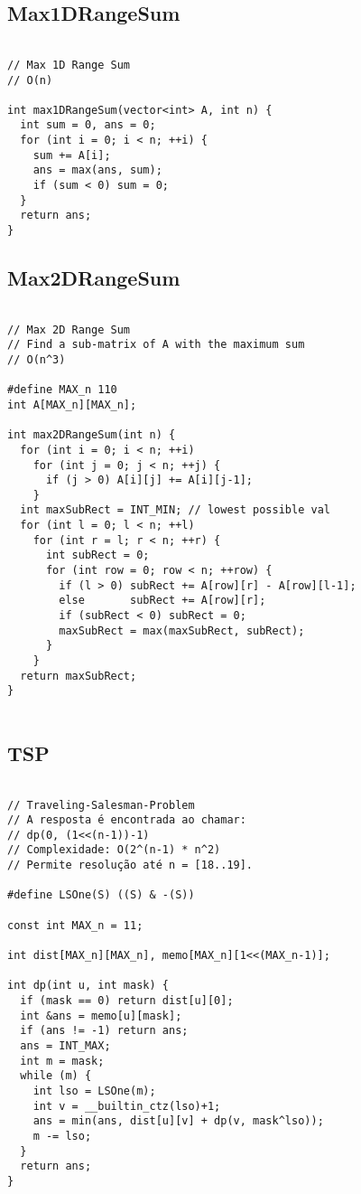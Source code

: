 \documentclass[landscape,twocolumn,10pt,a4paper]{article}
\begin{document}
\subsection{Max1DRangeSum}
\begin{verbatim}

// Max 1D Range Sum
// O(n)

int max1DRangeSum(vector<int> A, int n) {
  int sum = 0, ans = 0;
  for (int i = 0; i < n; ++i) {
    sum += A[i];
    ans = max(ans, sum);
    if (sum < 0) sum = 0;
  }
  return ans;
}

\end{verbatim}

\subsection{Max2DRangeSum}
\begin{verbatim}

// Max 2D Range Sum
// Find a sub-matrix of A with the maximum sum
// O(n^3)

#define MAX_n 110
int A[MAX_n][MAX_n];

int max2DRangeSum(int n) {
  for (int i = 0; i < n; ++i)
    for (int j = 0; j < n; ++j) {
      if (j > 0) A[i][j] += A[i][j-1];
    }
  int maxSubRect = INT_MIN; // lowest possible val
  for (int l = 0; l < n; ++l)
    for (int r = l; r < n; ++r) {
      int subRect = 0;
      for (int row = 0; row < n; ++row) {
        if (l > 0) subRect += A[row][r] - A[row][l-1];
        else       subRect += A[row][r];
        if (subRect < 0) subRect = 0;
        maxSubRect = max(maxSubRect, subRect);
      }
    }
  return maxSubRect;
}


\end{verbatim}

\subsection{TSP}
\begin{verbatim}

// Traveling-Salesman-Problem
// A resposta é encontrada ao chamar: 
// dp(0, (1<<(n-1))-1)
// Complexidade: O(2^(n-1) * n^2)
// Permite resolução até n = [18..19].

#define LSOne(S) ((S) & -(S))

const int MAX_n = 11;

int dist[MAX_n][MAX_n], memo[MAX_n][1<<(MAX_n-1)];

int dp(int u, int mask) {
  if (mask == 0) return dist[u][0];
  int &ans = memo[u][mask];
  if (ans != -1) return ans;
  ans = INT_MAX;
  int m = mask;
  while (m) {
    int lso = LSOne(m);
    int v = __builtin_ctz(lso)+1;
    ans = min(ans, dist[u][v] + dp(v, mask^lso));
    m -= lso;
  }
  return ans;
}

\end{verbatim}
\end{document}

